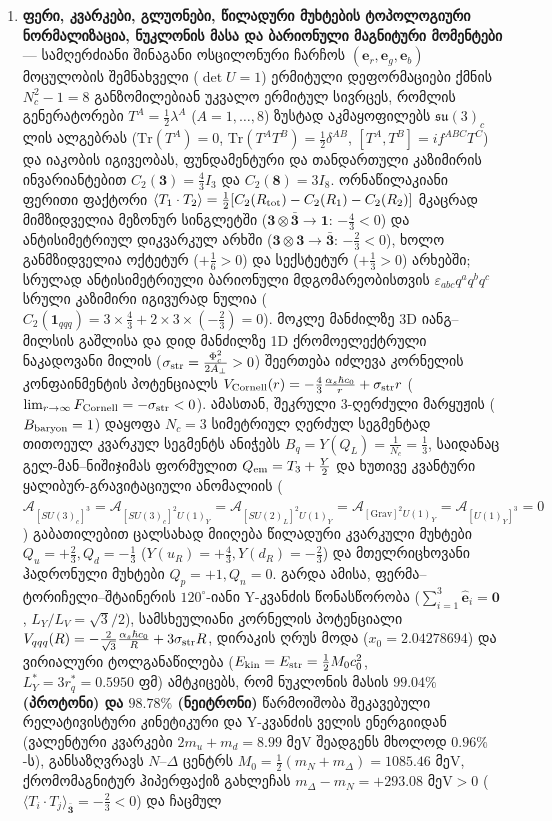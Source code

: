 \documentclass[11pt,a4paper]{article}
\begin{document}
\begin{enumerate}[label=\arabic*.]
\item \textbf{ფერი, კვარკები, გლუონები, წილადური მუხტების ტოპოლოგიური ნორმალიზაცია, ნუკლონის მასა და ბარიონული მაგნიტური მომენტები} — სამღერძიანი შინაგანი ოსცილონური ჩარჩოს $(\mathbf{e}_r, \mathbf{e}_g, \mathbf{e}_b)$ მოცულობის შემნახველი ($\det U = 1$) ერმიტული დეფორმაციები ქმნის $N_c^2 - 1 = 8$ განზომილებიან უკვალო ერმიტულ სივრცეს, რომლის გენერატორები $T^A = \frac{1}{2}\lambda^A$ ($A = 1,\dots,8$) ზუსტად აკმაყოფილებს $\mathfrak{su}(3)_c$ ლის ალგებრას ($\mathrm{Tr}(T^A) = 0$, $\mathrm{Tr}(T^A T^B) = \frac{1}{2}\delta^{AB}$, $[T^A, T^B] = i f^{ABC} T^C$) და იაკობის იგივეობას, ფუნდამენტური და თანდართული კაზიმირის ინვარიანტებით $C_2(\mathbf{3}) = \frac{4}{3}I_3$ და $C_2(\mathbf{8}) = 3 I_8$. ორნაწილაკიანი ფერითი ფაქტორი $\langle T_1\cdot T_2\rangle = \frac{1}{2}[C_2(R_{\rm tot}) - C_2(R_1) - C_2(R_2)]$ მკაცრად მიმზიდველია მეზონურ სინგლეტში ($\mathbf{3}\otimes\bar{\mathbf{3}} \to \mathbf{1}$: $-\frac{4}{3} < 0$) და ანტისიმეტრიულ დიკვარკულ არხში ($\mathbf{3}\otimes\mathbf{3} \to \bar{\mathbf{3}}$: $-\frac{2}{3} < 0$), ხოლო განმზიდველია ოქტეტურ ($+\frac{1}{6} > 0$) და სექსტეტურ ($+\frac{1}{3} > 0$) არხებში; სრულად ანტისიმეტრიული ბარიონული მდგომარეობისთვის $\varepsilon_{abc}q^a q^b q^c$ სრული კაზიმირი იგივურად ნულია ($C_2(\mathbf{1}_{qqq}) = 3\times\frac{4}{3} + 2\times 3\times(-\frac{2}{3}) = 0$). მოკლე მანძილზე 3D იანგ–მილსის გაშლისა და დიდ მანძილზე 1D ქრომოელექტრული ნაკადოვანი მილის ($\sigma_{\rm str} = \frac{\Phi_c^2}{2 A_\perp} > 0$) შეერთება იძლევა კორნელის კონფაინმენტის პოტენციალს $V_{\rm Cornell}(r) = -\frac{4}{3}\frac{\alpha_s\hbar c_0}{r} + \sigma_{\rm str}r$ ($\lim_{r\to\infty}F_{\rm Cornell} = -\sigma_{\rm str} < 0$). ამასთან, შეკრული 3-ღერძული მარყუჟის ($B_{\rm baryon}=1$) დაყოფა $N_c = 3$ სიმეტრიულ ღერძულ სეგმენტად თითოეულ კვარკულ სეგმენტს ანიჭებს $B_q = Y(Q_L) = \frac{1}{N_c} = \frac{1}{3}$, საიდანაც გელ-მან–ნიშიჯიმას ფორმულით $Q_{\rm em} = T_3 + \frac{Y}{2}$ და ხუთივე კვანტური ყალიბურ-გრავიტაციული ანომალიის ($\mathcal{A}_{[SU(3)_c]^3} = \mathcal{A}_{[SU(3)_c]^2 U(1)_Y} = \mathcal{A}_{[SU(2)_L]^2 U(1)_Y} = \mathcal{A}_{[\mathrm{Grav}]^2 U(1)_Y} = \mathcal{A}_{[U(1)_Y]^3} = 0$) გაბათილებით ცალსახად მიიღება წილადური კვარკული მუხტები $Q_u = +\frac{2}{3}, Q_d = -\frac{1}{3}$ ($Y(u_R) = +\frac{4}{3}, Y(d_R) = -\frac{2}{3}$) და მთელრიცხოვანი ჰადრონული მუხტები $Q_p = +1, Q_n = 0$. გარდა ამისა, ფერმა–ტორიჩელი–შტაინერის $120^\circ$-იანი Y-კვანძის წონასწორობა ($\sum_{i=1}^3\hat{\mathbf{e}}_i = \mathbf{0}$, $L_Y/L_V = \sqrt{3}/2$), სამსხეულიანი კორნელის პოტენციალი $V_{qqq}(R) = -\frac{2}{\sqrt{3}}\frac{\alpha_s\hbar c_0}{R} + 3\sigma_{\rm str}R$, დირაკის ღრუს მოდა ($x_0 = 2.04278694$) და ვირიალური ტოლგანაწილება ($E_{\rm kin} = E_{\rm str} = \frac{1}{2}M_0 c_0^2$, $L_Y^* = 3r_q^* = 0.5950\text{ ფმ}$) ამტკიცებს, რომ ნუკლონის მასის \textbf{$99.04\%$ (პროტონი) და $98.78\%$ (ნეიტრონი)} წარმოიშობა შეკავებული რელატივისტური კინეტიკური და Y-კვანძის ველის ენერგიიდან (ვალენტური კვარკები $2m_u+m_d = 8.99\text{ მეV}$ შეადგენს მხოლოდ $0.96\%$-ს), განსაზღვრავს $N$–$\Delta$ ცენტრს $M_0 = \frac{1}{2}(m_N+m_\Delta) = 1085.46\text{ მეV}$, ქრომომაგნიტურ ჰიპერფაქიზ გახლეჩას $m_\Delta - m_N = +293.08\text{ მეV} > 0$ ($\langle T_i\cdot T_j\rangle_{\bar{\mathbf{3}}} = -\frac{2}{3} < 0$) და ჩაცმულ 
\end{enumerate}
\end{document}
